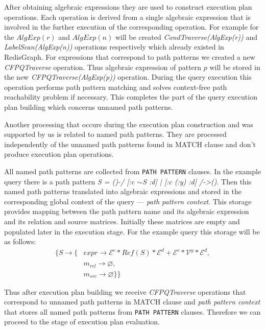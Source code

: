 After obtaining algebraic expressions they are used to construct execution plan operations. Each operation is derived from a single algebraic expression that is involved in the further execution of the corresponding operation. For example for the $AlgExp(r)$ and $AlgExp(n)$ will be created \textit{CondTraverse(AlgExp(r))} and \textit{LabelScan(AlgExp(n))} operations respectively which already existed in RedisGraph. For expressions that correspond to path patterns we created a new \textit{CFPQTraverse} operation. Thus algebraic expression of pattern $p$ will be stored in the new \textit{CFPQTraverse(AlgExp(p))} operation. During the query execution this operation performs path pattern matching and solves context-free path reachability problem if necessary. This completes the part of the query execution plan building which concerns unnamed path patterns.

Another processing that occurs during the execution plan construction and was supported by us is related to named path patterns. They are processed independently of the unnamed path patterns found in MATCH clause and don't produce execution plan operations. 

All named path patterns are collected from \lstinline{PATH PATTERN} clauses. In the example query there is a path pattern \textit{S = ()-/ [:c $\sim$S :d] | [:c (:y) :d] /->()}. Then this named path patterns translated into algebraic expressions and stored in the corresponding global context of the query --- \textit{path pattern context}. This storage provides mapping between the path pattern name and its algebraic expression and its relation and source matrices. Initially these matrices are empty and populated later in the execution stage. For the example query this storage will be as follows:
\begin{align*}
   \{ S  \xrightarrow{} \{ & expr \xrightarrow{} \mathcal{E}^c * Ref(S) * \mathcal{E}^d + \mathcal{E}^c * \mathcal{V}^y * \mathcal{E}^d, \\
                           & m_{rel} \xrightarrow{} \varnothing, \\
                           & m_{src} \xrightarrow{} \varnothing \} \}
\end{align*}

Thus after execution plan building we receive \textit{CFPQTraverse} operations that correspond to unnamed path patterns in MATCH clause and \textit{path pattern context} that stores all named path patterns from \lstinline{PATH PATTERN} clauses. Therefore we can proceed to the stage of execution plan evaluation.


